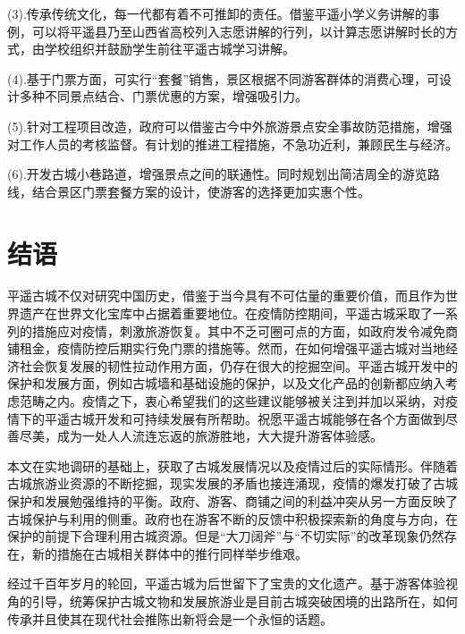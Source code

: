 \documentclass[UTF8]{ctexart}
\begin{document}
(3).传承传统文化，每一代都有着不可推卸的责任。借鉴平遥小学义务讲解的事例，可以将平遥县乃至山西省高校列入志愿讲解的行列，以计算志愿讲解时长的方式，由学校组织并鼓励学生前往平遥古城学习讲解。


(4).基于门票方面，可实行“套餐”销售，景区根据不同游客群体的消费心理，可设计多种不同景点结合、门票优惠的方案，增强吸引力。


(5).针对工程项目改造，政府可以借鉴古今中外旅游景点安全事故防范措施，增强对工作人员的考核监督。有计划的推进工程措施，不急功近利，兼顾民生与经济。


(6).开发古城小巷路道，增强景点之间的联通性。同时规划出简洁周全的游览路线，结合景区门票套餐方案的设计，使游客的选择更加实惠个性。
\section{结语}

平遥古城不仅对研究中国历史，借鉴于当今具有不可估量的重要价值，而且作为世界遗产在世界文化宝库中占据着重要地位。在疫情防控期间，平遥古城采取了一系列的措施应对疫情，刺激旅游恢复。其中不乏可圈可点的方面，如政府发令减免商铺租金，疫情防控后期实行免门票的措施等。然而，在如何增强平遥古城对当地经济社会恢复发展的韧性拉动作用方面，仍存在很大的挖掘空间。平遥古城开发中的保护和发展方面，例如古城墙和基础设施的保护，以及文化产品的创新都应纳入考虑范畴之内。疫情之下，衷心希望我们的这些建议能够被关注到并加以采纳，对疫情下的平遥古城开发和可持续发展有所帮助。祝愿平遥古城能够在各个方面做到尽善尽美，成为一处人人流连忘返的旅游胜地，大大提升游客体验感。

本文在实地调研的基础上，获取了古城发展情况以及疫情过后的实际情形。伴随着古城旅游业资源的不断挖掘，现实发展的矛盾也接连涌现，疫情的爆发打破了古城保护和发展勉强维持的平衡。政府、游客、商铺之间的利益冲突从另一方面反映了古城保护与利用的侧重。政府也在游客不断的反馈中积极探索新的角度与方向，在保护的前提下合理利用古城资源。但是“大刀阔斧”与“不切实际”的改革现象仍然存在，新的措施在古城相关群体中的推行同样举步维艰。

经过千百年岁月的轮回，平遥古城为后世留下了宝贵的文化遗产。基于游客体验视角的引导，统筹保护古城文物和发展旅游业是目前古城突破困境的出路所在，如何传承并且使其在现代社会推陈出新将会是一个永恒的话题。
\nocite{*}

\end{document}
